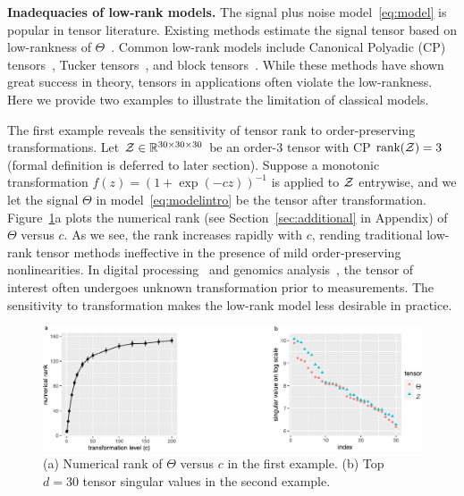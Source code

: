 \documentclass{article}
\theoremstyle{plain}
\theoremstyle{definition}
\begin{document}
{\bf Inadequacies of  low-rank models.} The signal plus noise model~\eqref{eq:model} is popular in tensor literature. Existing methods estimate the signal tensor based on low-rankness of $\Theta$~\citep{jain2014provable,montanari2018spectral}. Common low-rank models include Canonical Polyadic (CP) tensors~\citep{hitchcock1927expression}, Tucker tensors~\citep{de2000multilinear}, and block tensors~\citep{wang2019multiway}. While these methods have shown great success in theory, tensors in applications often violate the low-rankness. Here we provide two examples to illustrate the limitation of classical models.


The first example reveals the sensitivity of tensor rank to order-preserving transformations. Let $\mathcal{Z} \in \mathbb{R}^{30\times 30\times 30}$ be an order-3 tensor with CP $\text{rank}(\mathcal{Z})=3$ (formal definition is deferred to later section). Suppose a monotonic transformation $f(z)=(1+\exp(-cz))^{-1}$ is applied to $\mathcal{Z}$ entrywise, and we let the signal $\Theta$ in model~\eqref{eq:modelintro} be the tensor after transformation. Figure~\ref{fig:example}a plots the numerical rank (see Section~\ref{sec:additional} in Appendix) of $\Theta$ versus $c$. As we see, the rank increases rapidly with $c$, rending traditional low-rank tensor methods ineffective in the presence of mild order-preserving nonlinearities. In  digital processing~\citep{ghadermarzy2018learning} and genomics analysis~\citep{hore2016tensor}, the tensor of interest often undergoes unknown transformation prior to measurements. The sensitivity to transformation makes the low-rank model less desirable in practice. 

\begin{figure}[h]
\captionsetup{font=scriptsize}
\centering
\vspace{-.3cm}
\includegraphics[width=.7\textwidth]{figure/example_comb2.pdf}
\vspace{-.2cm}
\caption{\scriptsize (a) Numerical rank of $\Theta$ versus $c$ in the first example. (b) Top $d=30$ tensor singular values in the second example. }
\vspace{-.3cm}
\label{fig:example}
\end{figure}
\end{document}
